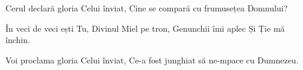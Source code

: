 \beginverse
Cerul declară gloria Celui înviat,
Cine se compară cu frumusețea Domnului?
\endverse

\beginchorus
În veci de veci ești Tu,
Divinul Miel pe tron,
Genunchii îmi aplec
Și Ție mă închin.
\endchorus

\beginverse
Voi proclama gloria Celui înviat,
Ce-a fost junghiat să ne-mpace cu Dumnezeu.
\endverse
\endsong